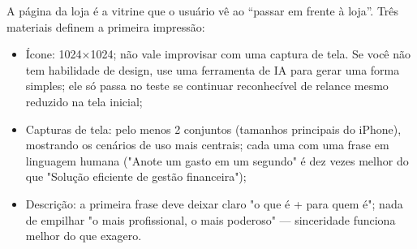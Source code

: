 
A página da loja é a vitrine que o usuário vê ao “passar em frente à loja”. Três materiais definem a primeira impressão:

\begin{itemize}
  \item Ícone: 1024×1024; não vale improvisar com uma captura de tela. Se você não tem habilidade de design, use uma ferramenta de IA para gerar uma forma simples; ele só passa no teste se continuar reconhecível de relance mesmo reduzido na tela inicial;
  \item Capturas de tela: pelo menos 2 conjuntos (tamanhos principais do iPhone), mostrando os cenários de uso mais centrais; cada uma com uma frase em linguagem humana ("Anote um gasto em um segundo" é dez vezes melhor do que "Solução eficiente de gestão financeira");
  \item Descrição: a primeira frase deve deixar claro "o que é + para quem é"; nada de empilhar "o mais profissional, o mais poderoso" — sinceridade funciona melhor do que exagero.
\end{itemize}

